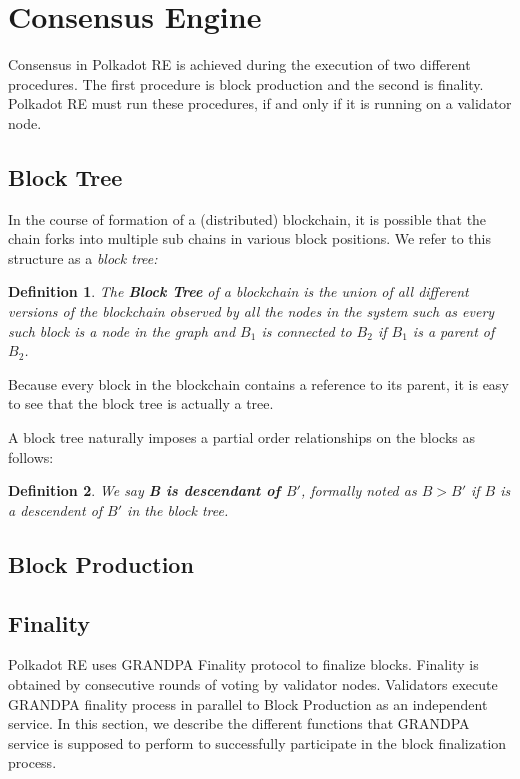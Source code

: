 \documentclass{article}
\newcommand{\tmem}[1]{{\em #1\/}}
\newcommand{\tmstrong}[1]{\textbf{#1}}
\newcommand{\tmtextbf}[1]{{\bfseries{#1}}}
\newcommand{\tmtextit}[1]{{\itshape{#1}}}
\newtheorem{definition}{Definition}
\providecommand{\tmem}[1]{\tmtextit{#1}}
\providecommand{\tmstrong}[1]{\tmtextbf{#1}}
\providecommand{\tmtextbf}[1]{\tmtextbf{#1}}
\providecommand{\tmtextit}[1]{\tmtextit{#1}}
\newtheorem{definition}{Definition}
\begin{document}
\section{Consensus Engine}

Consensus in Polkadot RE is achieved during the execution of two different
procedures. The first procedure is block production and the second is
finality. Polkadot RE must run these procedures, if and only if it is running
on a validator node.

\subsection{Block Tree}

In the course of formation of a (distributed) blockchain, it is possible that
the chain forks into multiple sub chains in various block positions. We refer to
this structure as a {\tmem{block tree:}}

\begin{definition}
  The {\tmstrong{Block Tree}} of a blockchain is the union of all different
  versions of the blockchain observed by all the nodes in the system such as
  every such block is a node in the graph and $B_1$ is connected to $B_2$ if
  $B_1$ is a parent of $B_2$.
\end{definition}

Because every block in the blockchain contains a reference to its parent, it is easy to see that the block tree is actually a tree. 

A block tree naturally imposes a partial order relationships on the blocks as
follows:

\begin{definition}
  We say {\tmstrong{B is descendant of $B'$}}, formally noted as {\tmstrong{$B
  > B'$}} if $B$ is a descendent of $B'$ in the block tree. \ 
\end{definition}

\subsection{Block Production}

\subsection{Finality}

Polkadot RE uses GRANDPA Finality protocol {\cite{AlSt19-Grandpai}} to finalize
blocks. Finality is obtained by consecutive rounds of voting by validator
nodes. Validators execute GRANDPA finality process in parallel to Block
Production as an independent service. In this section, we describe the
different functions that GRANDPA service is supposed to perform to
successfully participate in the block finalization process.
\end{document}
